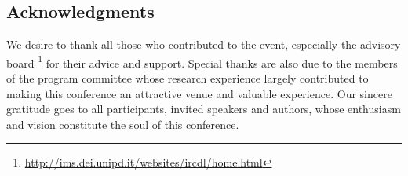 \documentclass{sig-alternate-10pt}
\begin{document}
\subsection*{Acknowledgments}
We desire to thank all those who contributed to the
event, especially the advisory board \footnote{\url{http://ims.dei.unipd.it/websites/ircdl/home.html}} for their advice and support. Special thanks
are also due to the members of the program committee whose research experience largely contributed
to making this conference an attractive venue and
valuable experience. Our sincere gratitude goes to
all participants, invited speakers and authors, whose
enthusiasm and vision constitute the soul of this
conference.


%


\end{document}
